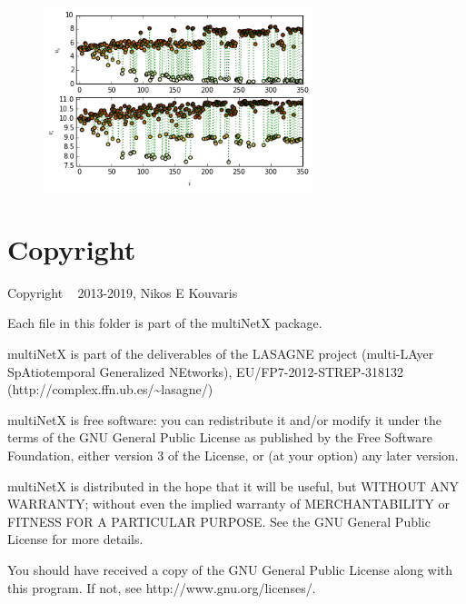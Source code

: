 \documentclass[11pt]{article}
\begin{document}
\begin{figure}[h!]
\centering
\includegraphics[width=0.7\textwidth]{multiplex_turing_patterns_27_0.png}
\end{figure}


\pagebreak

\section{Copyright}\label{copyright}

Copyright \textcopyright~ 2013-2019, Nikos E Kouvaris


\vspace{10pt}
\noindent Each file in this folder is part of the multiNetX package.

\vspace{10pt}
\noindent multiNetX is part of the deliverables of the LASAGNE project
(multi-LAyer SpAtiotemporal Generalized NEtworks),
EU/FP7-2012-STREP-318132
(http://complex.ffn.ub.es/\textasciitilde{}lasagne/)

\vspace{10pt}
\noindent multiNetX is free software: you can redistribute it and/or modify it
under the terms of the GNU General Public License as published by the
Free Software Foundation, either version 3 of the License, or (at your
option) any later version.

\vspace{10pt}
\noindent multiNetX is distributed in the hope that it will be useful, but WITHOUT
ANY WARRANTY; without even the implied warranty of MERCHANTABILITY or
FITNESS FOR A PARTICULAR PURPOSE. See the GNU General Public License for
more details.

\vspace{10pt}
\noindent You should have received a copy of the GNU General Public License along
with this program. If not, see http://www.gnu.org/licenses/.
\end{document}

